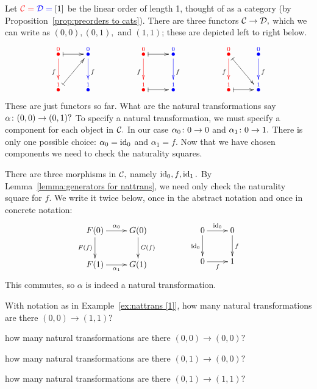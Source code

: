 \documentclass[../main/CT4S-EN-RU]{subfiles}
\begin{document}
\begin{proofRUS}
\end{proofRUS}

\begin{exampleENG}\label{ex:nattrans [1]}
Let $\color{red}{\mathcal{C}}=\color{blue}{\mathcal{D}}=\color{black}{[1]}$ be the linear order of length 1, thought of as a category (by Proposition~\ref{prop:preorders to cats}). There are three functors $\mathcal{C}\rightarrow\mathcal{D},$ which we can write as $(0,0), (0,1),$ and $(1,1)$; these are depicted left to right below.
$$\xymatrix{
\LMO{\color{red}{0}}\ar@{|->}[r]\ar@[red][d]_f&\LMO{\color{blue}{0}}\ar@[blue][d]^f&&\LMO{\color{red}{0}}\ar@{|->}[r]\ar@[red][d]_f&\LMO{\color{blue}{0}}\ar@[blue][d]^f&&\LMO{\color{red}{0}}\ar@{|->}[dr]\ar@[red][d]_f&\LMO{\color{blue}{0}}\ar@[blue][d]^f\\
\LMO{\color{red}{1}}\ar@{|->}[ur]&\LMO{\color{blue}{1}}&&\LMO{\color{red}{1}}\ar@{|->}[r]&\LMO{\color{blue}{1}}&&\LMO{\color{red}{1}}\ar@{|->}[r]&\LMO{\color{blue}{1}}
}
$$
These are just functors so far. What are the natural transformations say $\alpha\colon (0,0)\rightarrow(0,1)?$ To specify a natural transformation, we must specify a component for each object in $\mathcal{C}.$ In our case $\alpha_0\colon 0\rightarrow 0$ and $\alpha_1\colon 0\rightarrow 1.$ There is only one possible choice: $\alpha_0=\operatorname{id}_0$ and $\alpha_1=f.$ Now that we have chosen components we need to check the naturality squares. 

There are three morphisms in $\mathcal{C},$ namely $\operatorname{id}_0, f, \operatorname{id}_1.$ By Lemma~\ref{lemma:generators for nattrans}, we need only check the naturality square for $f.$ We write it twice below, once in the abstract notation and once in concrete notation:
$$
\xymatrix{
F(0)\ar[r]^{\alpha_0}\ar[d]_{F(f)}&G(0)\ar[d]^{G(f)}\\
F(1)\ar[r]_{\alpha_1}&G(1)
}\hspace{.5in}
\xymatrix{
0\ar[r]^{\id_0}\ar[d]_{\id_0}&0\ar[d]^{f}\\
0\ar[r]_{f}&1
}
$$
This commutes, so $\alpha$ is indeed a natural transformation.
\end{exampleENG}

\begin{exampleRUS}\label{ex:nattrans [1]}
\end{exampleRUS}

\begin{exerciseENG}
With notation as in Example~\ref{ex:nattrans [1]},
\sexc how many natural transformations are there $(0,0)\to (1,1)?$
\item how many natural transformations are there $(0,0)\to (0,0)?$
\item how many natural transformations are there $(0,1)\to (0,0)?$
\item how many natural transformations are there $(0,1)\to (1,1)?$
\endsexc
\end{exerciseENG}
\end{document}
